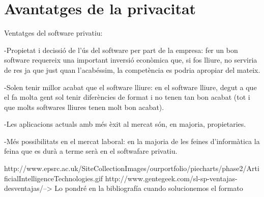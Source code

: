 \section{Avantatges de la privacitat}

Ventatges del software privatiu: 

-Propietat i decissió de l'ús del software per part de la empresa: fer un bon software 
requereix una important inversió econòmica que, si fos lliure, no serviria de res ja 
que just quan l'acabéssim, la competència es podria apropiar del mateix.

-Solen tenir millor acabat que el software lliure: en el software lliure, degut a que
 el fa molta gent sol tenir diferències de format i no tenen tan bon acabat (tot i que
 molts softwares lliures tenen molt bon acabat).

-Les aplicacions actuals amb més èxit al mercat són, en majoria, propietaries.

-Més possibilitats en el mercat laboral: en la majoria de les feines d'informàtica la
feina que es durà a terme serà en el softwafare privatiu.






http://www.epsrc.ac.uk/SiteCollectionImages/ourportfolio/piecharts/phase2/ArtificialIntelligenceTechnologies.gif
http://www.gentegeek.com/sl-sp-ventajas-desventajas/--> Lo pondré en la bibliografía cuando 
solucionemos el formato

